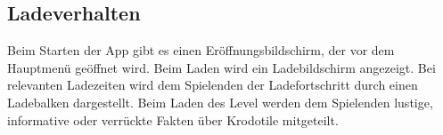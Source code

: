\subsection{Ladeverhalten}
\begin {requirements}
	 Beim Starten der App gibt es einen Eröffnungsbildschirm, der vor dem Hauptmenü geöffnet wird.
	 Beim Laden wird ein Ladebildschirm angezeigt.
	 Bei relevanten Ladezeiten wird dem Spielenden der Ladefortschritt durch einen Ladebalken dargestellt.
	 Beim Laden des Level werden dem Spielenden lustige, informative oder verrückte Fakten über Krodotile mitgeteilt.
\end {requirements}
